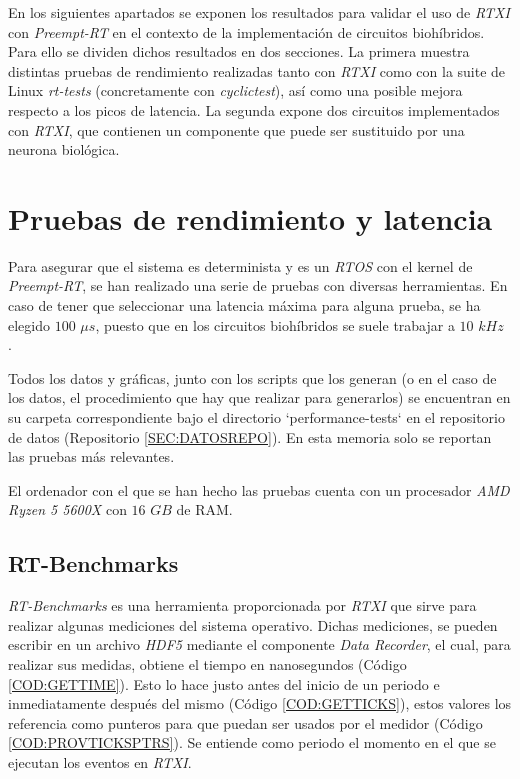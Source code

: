
En los siguientes apartados se exponen los resultados para validar el uso de \textit{RTXI} con \textit{Preempt-RT} en el contexto de la implementación de circuitos biohíbridos. Para ello se dividen dichos resultados en dos secciones. La primera muestra distintas pruebas de rendimiento realizadas tanto con \textit{RTXI} como con la suite de Linux \textit{rt-tests} (concretamente con \textit{cyclictest}), así como una posible mejora respecto a los picos de latencia. La segunda expone dos circuitos implementados con \textit{RTXI}, que contienen un componente que puede ser sustituido por una neurona biológica.

\section{Pruebas de rendimiento y latencia\label{SEC:PRUEVASRENDIMIENTOLATENCIA}}


Para asegurar que el sistema es determinista y es un \textit{RTOS} con el kernel de \textit{Preempt-RT}, se han realizado una serie de pruebas con diversas herramientas. En caso de tener que seleccionar una latencia máxima para alguna prueba, se ha elegido $100$ $\mu s$, puesto que en los circuitos biohíbridos se suele trabajar a $10$ $kHz$ \cite{Amaducci2019}.

Todos los datos y gráficas, junto con los scripts que los generan (o en el caso de los datos, el procedimiento que hay que realizar para generarlos) se encuentran en su carpeta correspondiente bajo el directorio `performance-tests` en el repositorio de datos (Repositorio \ref{SEC:DATOSREPO}). En esta memoria solo se reportan las pruebas más relevantes.

El ordenador con el que se han hecho las pruebas cuenta con un procesador \textit{AMD Ryzen 5 5600X} con $16$ $GB$ de RAM.

\subsection{RT-Benchmarks\label{SS:RTBENCHMARKS}}

\textit{RT-Benchmarks} es una herramienta proporcionada por \textit{RTXI} que sirve para realizar algunas mediciones del sistema operativo. Dichas mediciones, se pueden escribir en un archivo \textit{HDF5} mediante el componente \textit{Data Recorder}, el cual, para realizar sus medidas, obtiene el tiempo en nanosegundos (Código \ref{COD:GETTIME}). Esto lo hace justo antes del inicio de un periodo e inmediatamente después del mismo (Código \ref{COD:GETTICKS}), estos valores los referencia como punteros para que puedan ser usados por el medidor (Código \ref{COD:PROVTICKSPTRS}). Se entiende como periodo el momento en el que se ejecutan los eventos en \textit{RTXI}.

